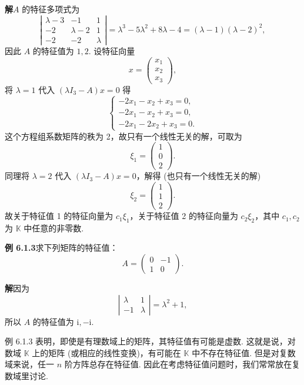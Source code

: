 \documentclass[UTF8,12pt,a4paper,fontset=fandol]{ctexart}
\begin{document}
\noindent\textbf{解}\quad $A$ 的特征多项式为
\[
\left|\begin{array}{ccc}
\lambda-3 & -1 & 1\\
-2 & \lambda-2 & 1\\
-2 & -2 & \lambda
\end{array}\right|
=\lambda^3-5\lambda^2+8\lambda-4=(\lambda-1)(\lambda-2)^2,
\]
因此 $A$ 的特征值为 $1,2$. 设特征向量
\[
x=\left(\begin{array}{c}
x_1\\
x_2\\
x_3
\end{array}\right),
\]
将 $\lambda=1$ 代入 $(\lambda I_3-A)x=0$ 得
\[
\left\{\begin{array}{l}
-2x_1-x_2+x_3=0,\\
-2x_1-x_2+x_3=0,\\
-2x_1-2x_2+x_3=0.
\end{array}\right.
\]
这个方程组系数矩阵的秩为 2，故只有一个线性无关的解，可取为
\[
\xi_1=\left(\begin{array}{c}
1\\
0\\
2
\end{array}\right).
\]
同理将 $\lambda=2$ 代入 $(\lambda I_3-A)x=0$，解得 (也只有一个线性无关的解)
\[
\xi_2=\left(\begin{array}{c}
1\\
1\\
2
\end{array}\right).
\]
故关于特征值 1 的特征向量为 $c_1\xi_1$，关于特征值 2 的特征向量为 $c_2\xi_2$，其中 $c_1,c_2$ 为 $\mathbb{K}$ 中任意的非零数.

\noindent\textbf{例 6.1.3}\quad 求下列矩阵的特征值：
\[
A=\left(\begin{array}{cc}
0 & -1\\
1 & 0
\end{array}\right).
\]

\noindent\textbf{解}\quad 因为
\[
\left|\begin{array}{cc}
\lambda & 1\\
-1 & \lambda
\end{array}\right|=\lambda^2+1,
\]
所以 $A$ 的特征值为 $\mathrm{i},-\mathrm{i}$.

例 6.1.3 表明，即使是有理数域上的矩阵，其特征值有可能是虚数. 这就是说，对数域 $\mathbb{K}$ 上的矩阵 (或相应的线性变换)，有可能在 $\mathbb{K}$ 中不存在特征值. 但是对复数域来说，任一 $n$ 阶方阵总存在特征值. 因此在考虑特征值问题时，我们常常放在复数域里讨论.
\end{document}
